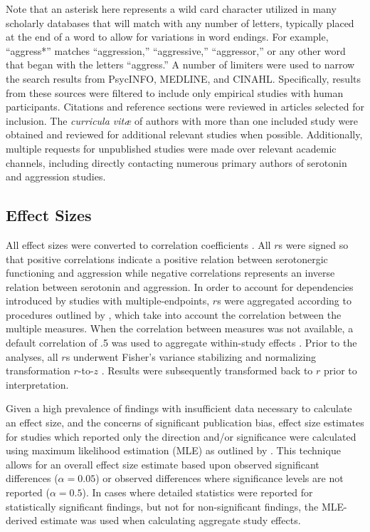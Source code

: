 \documentclass[jou]{apa6}
\begin{document}
Note that an asterisk here represents a wild card character utilized in many scholarly databases that will match with any number of letters, typically placed at the end of a word to allow for variations in word endings. For example, ``aggress*'' matches ``aggression,'' ``aggressive,'' ``aggressor,'' or any other word that began with the letters ``aggress.'' A number of limiters were used to narrow the search results from PsycINFO, MEDLINE, and CINAHL. Specifically, results from these sources were filtered to include only empirical studies with human participants. Citations and reference sections were reviewed in articles selected for inclusion. The \emph{curricula vit\ae} of authors with more than one included study were obtained  and reviewed for additional relevant studies when possible. Additionally, multiple requests for unpublished studies were made over relevant academic channels, including directly contacting numerous primary authors of serotonin and aggression studies.



\subsection{Effect Sizes}
All effect sizes were converted to correlation coefficients \parencite{Borenstein09}. All $r$s were signed so that positive correlations indicate a positive relation between serotonergic functioning and aggression while negative correlations represents an inverse relation between serotonin and aggression. In order to account for dependencies introduced by studies with multiple-endpoints, $r$s were aggregated according to procedures outlined by \textcite{GleserOlkin2009}, which take into account the correlation between the multiple measures. When the correlation between measures was not available, a default correlation of .5 was used to aggregate within-study effects \parencite{Wampold1997}.  
Prior to the analyses, all $r$s underwent Fisher's variance stabilizing and normalizing transformation $r$-to-$z$ \parencite{FishersZ}.  Results were subsequently transformed back to $r$ prior to interpretation.


Given a high prevalence of findings with insufficient data necessary to calculate an effect size, and the concerns of significant publication bias, effect size estimates for studies which reported only the direction and/or significance were calculated using maximum likelihood estimation (MLE) as outlined by \textcite{BushmanWang09}. This technique allows for an overall effect size estimate based upon observed significant differences ($\alpha = 0.05$) or observed differences where significance levels are not reported ($\alpha = 0.5$). In cases where detailed statistics were reported for statistically significant findings, but not for non-significant findings, the MLE-derived estimate was used when calculating aggregate study effects.
\end{document}
